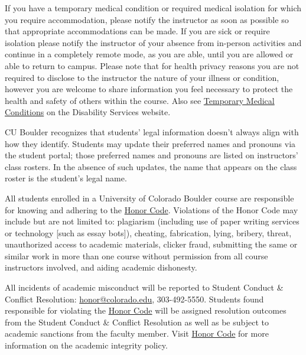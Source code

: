 If you have a temporary medical condition or required medical isolation for which you require accommodation,  please notify the instructor as soon as possible so that appropriate accommodations can be made.
If you are sick or require isolation please notify the instructor of your absence from in-person activities and continue in a completely remote mode, as you are able, until you are allowed or able to return to campus.
Please note that for health privacy reasons you are not required to disclose to the instructor the nature of your illness or condition, however you are welcome to share information you feel necessary to protect the health and safety of others within the course.
Also see \href{http://www.colorado.edu/disabilityservices/students/temporary-medical-conditions}{Temporary Medical Conditions} on the Disability Services website.
 
\item[Preferred Student Names and Pronouns:]
CU Boulder recognizes that students' legal information doesn't always align with how they identify. 
Students may update their preferred names and pronouns via the student portal; those preferred names and pronouns are listed on instructors' class rosters. 
In the absence of such updates, the name that appears on the class roster is the student's legal name.

\item[Honor Code:] 
All students enrolled in a University of Colorado Boulder course are responsible for knowing and adhering to the  \href{https://www.colorado.edu/sccr/honor-code}{Honor Code}. 
Violations of the Honor Code may include but are not limited to: plagiarism (including use of paper writing services or technology [such as essay bots]), cheating, fabrication, lying, bribery, threat, unauthorized access to academic materials, clicker fraud, submitting the same or similar work in more than one course without permission from all course instructors involved, and aiding academic dishonesty. 

All incidents of academic misconduct will be reported to Student Conduct \& Conflict Resolution: \href{mailto:honor@colorado.edu}{honor@colorado.edu}, 303-492-5550. 
Students found responsible for violating the \href{https://www.colorado.edu/sccr/honor-code}{Honor Code} will be assigned resolution outcomes from the Student Conduct \& Conflict Resolution as well as be subject to academic sanctions from the faculty member. 
Visit \href{https://www.colorado.edu/sccr/honor-code}{Honor Code} for more information on the academic integrity policy.

